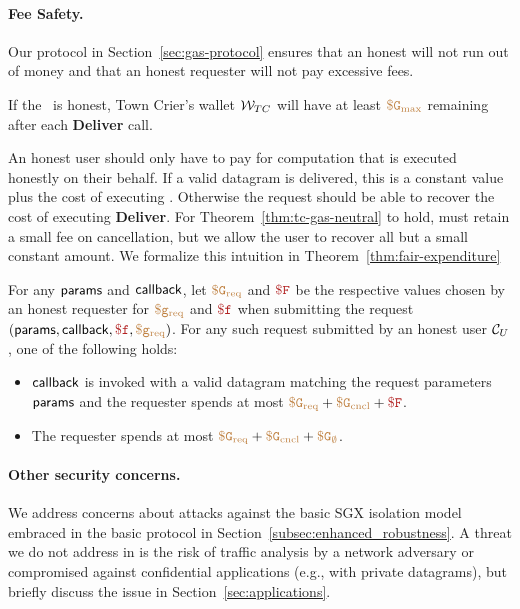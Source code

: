 \paragraph{Fee Safety.}
Our protocol in Section~\ref{sec:gas-protocol} ensures that an honest \tcs will not run out of money
and that an honest requester will not pay excessive fees.

\begin{theorem}
\label{thm:tc-gas-neutral}
If the \tc~\medname is honest,
Town Crier's wallet ${\cal W}_{TC}$ will have at least $\tt {\color{brown} \$G_\text{max} }$ remaining after each {\bf Deliver} call.
\end{theorem}

An honest user should only have to pay for computation that is executed honestly on their behalf.
If a valid datagram is delivered, this is a constant value plus the cost of executing \dgcallback.
Otherwise the request should be able to recover the cost of executing {\bf Deliver}.
For Theorem~\ref{thm:tc-gas-neutral} to hold, \tcont must retain a small fee on cancellation,
but we allow the user to recover all but a small constant amount.
We formalize this intuition in Theorem~\ref{thm:fair-expenditure}

\begin{theorem}
\label{thm:fair-expenditure}
For any ${\sf params}$ and ${\sf callback}$,
let $\tt {\color{brown} \$G_\text{req} }$ and $\consthonestfee$ be the respective values chosen by an honest requester for $\tt {\color{brown} \$g_\text{req} }$ and $\fee$
when submitting the request $(\dgform, \dgcallback, \fee, \gasrequest)$.
For any such request submitted by an honest user ${\cal C}_U$, one of the following holds:
\vspace{-0.4em}
\begin{itemize}
  \setlength{\itemsep}{2pt}
  \setlength{\parskip}{0pt}
  \setlength{\parsep}{0pt}
  \item ${\sf callback}$ is invoked with a valid datagram matching the request parameters ${\sf params}$
    and the requester spends at most $\constgasrequest + \constgasinvokecancel + \consthonestfee$.

  \item The requester spends at most $\tt {\color{brown} \$G_\text{req} } + \tt {\color{brown} \$G_\text{cncl} } + \tt {\color{brown} \$G_\emptyset }$.
\end{itemize}
\end{theorem}





\paragraph{Other security concerns.} We address concerns about attacks against the basic SGX isolation model embraced in the basic \tc protocol in Section~\ref{subsec:enhanced_robustness}. A threat we do not address in \tc is the risk of traffic analysis by a network adversary or compromised \medname against confidential applications (e.g., with private datagrams), but briefly discuss the issue in Section~\ref{sec:applications}.


